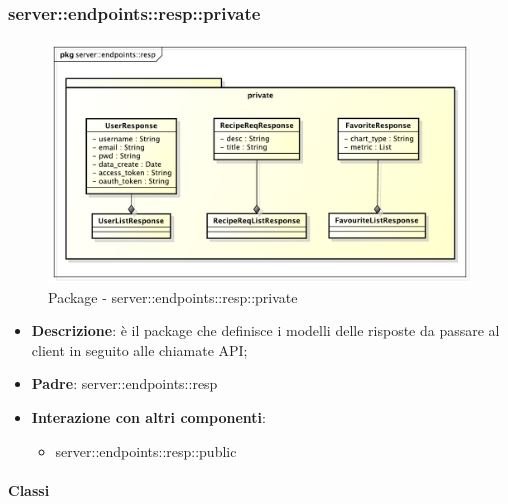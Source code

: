 \subsubsection{server::endpoints::resp::private} %
\label{ssub:bdsm_app_server_endpoints_resp_private}
\begin{figure}[!htbp]
  \centering
  \centerline{\includegraphics[scale=0.45]{./images/server/resp_private.pdf}}
  \caption{Package - server::endpoints::resp::private}
\end{figure}

\begin{itemize}
  \item \textbf{Descrizione}: è il package che definisce i modelli delle risposte da passare al client in seguito alle chiamate API;
  \item \textbf{Padre}: server::endpoints::resp
  \item \textbf{Interazione con altri componenti}:
    \begin{itemize}
      \item server::endpoints::resp::public
  \end{itemize}
\end{itemize}

  \paragraph{Classi} %


